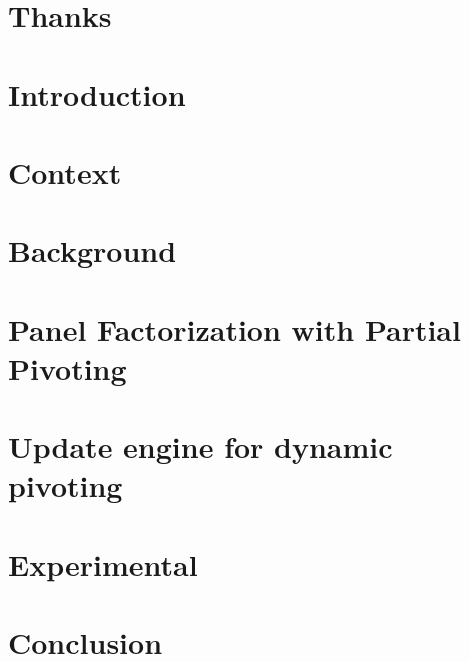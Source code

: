 \maketitle
\newpage
\null
\newpage

%  

\chapter*{Thanks}%


\tableofcontents
\newpage





\chapter{Introduction}\label{intro}%


\chapter{Context}\label{context}


\chapter{Background}\label{background}


\chapter{Panel Factorization with Partial Pivoting}\label{panel}


\chapter{Update engine for dynamic pivoting}\label{update}


\chapter{Experimental}\label{experimental}


\chapter*{Conclusion}\label{conclusion}







